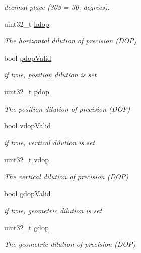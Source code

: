 \begin{DoxyCompactItemize}
\begin{DoxyCompactList}\small\item\em decimal place (308 = 30. degrees). \end{DoxyCompactList}\item 
uint32\+\_\+t \hyperlink{structpa___gnss___position__t_a7dd0659011decfd0cef5fa4e1c6d3ab7}{hdop}
\begin{DoxyCompactList}\small\item\em The horizontal dilution of precision (D\+OP) \end{DoxyCompactList}\item 
bool \hyperlink{structpa___gnss___position__t_a03bb52ad2b22096d3842d1b598f8777a}{pdop\+Valid}
\begin{DoxyCompactList}\small\item\em if true, position dilution is set \end{DoxyCompactList}\item 
uint32\+\_\+t \hyperlink{structpa___gnss___position__t_ad4a591dd481f876540d9b8ed20cabcdc}{pdop}
\begin{DoxyCompactList}\small\item\em The position dilution of precision (D\+OP) \end{DoxyCompactList}\item 
bool \hyperlink{structpa___gnss___position__t_af63b4e99838258fceea9a3a08b7516f6}{vdop\+Valid}
\begin{DoxyCompactList}\small\item\em if true, vertical dilution is set \end{DoxyCompactList}\item 
uint32\+\_\+t \hyperlink{structpa___gnss___position__t_a35451034d0b82b8e0f0f40a8b412976e}{vdop}
\begin{DoxyCompactList}\small\item\em The vertical dilution of precision (D\+OP) \end{DoxyCompactList}\item 
bool \hyperlink{structpa___gnss___position__t_a1edc2cb733a550717d6ff58ca15cbdb1}{gdop\+Valid}
\begin{DoxyCompactList}\small\item\em if true, geometric dilution is set \end{DoxyCompactList}\item 
uint32\+\_\+t \hyperlink{structpa___gnss___position__t_a71d2363047b43222fa34f934ee99286e}{gdop}
\begin{DoxyCompactList}\small\item\em The geometric dilution of precision (D\+OP) \end{DoxyCompactList}\item 

\end{DoxyCompactItemize}
